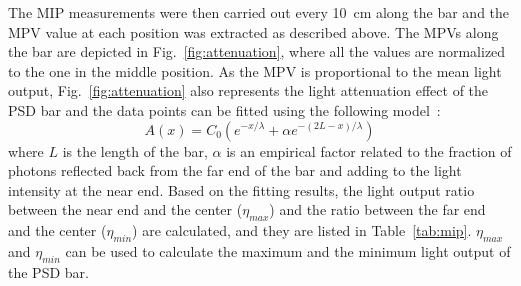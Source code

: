 \documentclass[preprint, times]{elsarticle}
\begin{document}
The MIP measurements were then carried out every \SI{10}{\centi\meter} along the bar and the MPV value at each position was extracted as described above.
The MPVs along the bar are depicted in Fig.~\ref{fig:attenuation}, where all the values are normalized to the one in the middle position.
As the MPV is proportional to the mean light output, Fig.~\ref{fig:attenuation} also represents the light attenuation effect of the PSD bar and the data points can be fitted using the following model~\cite{taiuti_measurement_1996}:
\begin{equation}
\label{eq:attenuation}
A(x)=C_0(e^{-x/\lambda} + \alpha e^{-(2L-x)/\lambda})
\end{equation}
where $L$ is the length of the bar, $\alpha$ is an empirical factor related to the fraction of photons reflected back from the far end of the bar and adding to the light intensity at the near end.
Based on the fitting results, the light output ratio between the near end and the center ($\eta_{max}$) and the ratio between the far end and the center ($\eta_{min}$) are calculated,  and they are listed in Table~\ref{tab:mip}.
$\eta_{max}$ and $\eta_{min}$ can be used to calculate the maximum and the minimum light output of the PSD bar.
\end{document}
